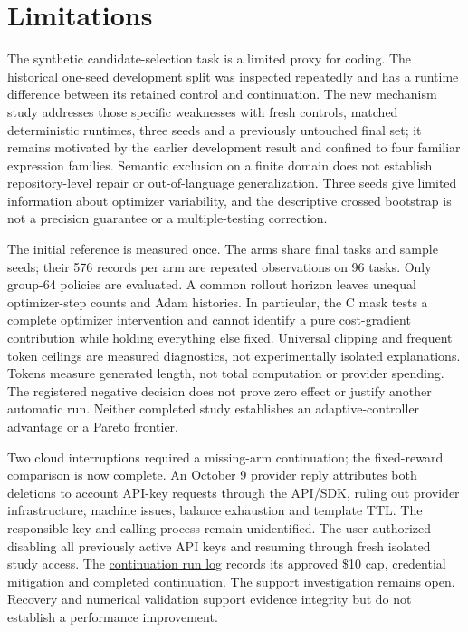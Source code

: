\documentclass[11pt]{article}
\begin{document}

\section{Limitations}

The synthetic candidate-selection task is a limited proxy for coding. The historical one-seed development split was inspected repeatedly and has a runtime difference between its retained control and continuation. The new mechanism study addresses those specific weaknesses with fresh controls, matched deterministic runtimes, three seeds and a previously untouched final set; it remains motivated by the earlier development result and confined to four familiar expression families. Semantic exclusion on a finite domain does not establish repository-level repair or out-of-language generalization. Three seeds give limited information about optimizer variability, and the descriptive crossed bootstrap is not a precision guarantee or a multiple-testing correction.

The initial reference is measured once. The arms share final tasks and sample seeds; their 576 records per arm are repeated observations on 96 tasks. Only group-64 policies are evaluated. A common rollout horizon leaves unequal optimizer-step counts and Adam histories. In particular, the C mask tests a complete optimizer intervention and cannot identify a pure cost-gradient contribution while holding everything else fixed. Universal clipping and frequent token ceilings are measured diagnostics, not experimentally isolated explanations. Tokens measure generated length, not total computation or provider spending. The registered negative decision does not prove zero effect or justify another automatic run. Neither completed study establishes an adaptive-controller advantage or a Pareto frontier.

Two cloud interruptions required a missing-arm continuation; the fixed-reward comparison is now complete. An October 9 provider reply attributes both deletions to account API-key requests through the API/SDK, ruling out provider infrastructure, machine issues, balance exhaustion and template TTL. The responsible key and calling process remain unidentified. The user authorized disabling all previously active API keys and resuming through fresh isolated study access. The \href{https://github.com/arpjw/reward-function/blob/research-v1.1.0/docs/REWARD_CONTINUATION_RUN.md}{continuation run log} records its approved \$10 cap, credential mitigation and completed continuation. The support investigation remains open. Recovery and numerical validation support evidence integrity but do not establish a performance improvement.
\end{document}
